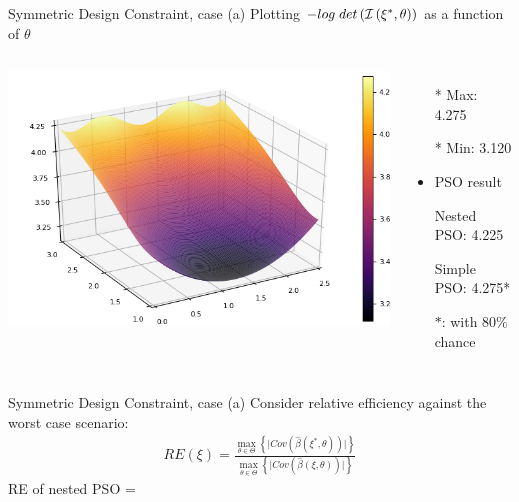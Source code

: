 \documentclass{beamer}
\begin{document}
\begin{frame}{Symmetric Design Constraint, case (a)}
  Plotting $-log \hspace{1mm} det \left( \mathcal{I} \left( \xi^*,\theta \right) \right)$ as a function of $\theta$\\
  \begin{columns}
    \begin{center}
      \includegraphics[scale=0.5]{surfacea_sym.png}
    \end{center}
    \begin{itemize}
      \item[*] Max: 4.275
      \item[*] Min: 3.120
      \vspace{5mm}
      \item PSO result
      \item[] Nested PSO: 4.225
      \item[] Simple PSO: 4.275*
      \item[] $\ast$: with 80\% chance
    \end{itemize}
  \end{columns}
\end{frame}

\begin{frame}{Symmetric Design Constraint, case (a)}
  Consider relative efficiency against the worst case scenario:
  \begin{align*}
    RE(\xi) =  \frac{\max_{\theta\in\Theta}\left\{\lvert Cov(\hat{\beta}(\xi^*,\theta))\rvert\right\}}{\max_{\theta\in\Theta}\left\{\lvert Cov(\hat{\beta}(\xi,\theta))\rvert\right\} }
  \end{align*}
  RE of nested PSO = 
  
\end{frame}
\end{document}
